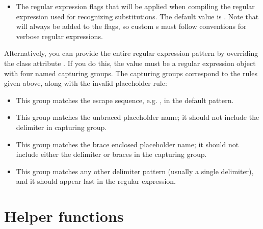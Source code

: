 \documentclass[letterpaper,10pt,english]{sphinxmanual}
\begin{document}
\begin{itemize}

\item {}
 \textendash{} The regular expression flags that will be applied when compiling
the regular expression used for recognizing substitutions.  The default value
is .  Note that  will always be added to the
flags, so custom s must follow conventions for verbose regular
expressions.


\end{itemize}

Alternatively, you can provide the entire regular expression pattern by
overriding the class attribute .  If you do this, the value must be a
regular expression object with four named capturing groups.  The capturing
groups correspond to the rules given above, along with the invalid placeholder
rule:
\begin{itemize}
\item {}
 \textendash{} This group matches the escape sequence, e.g. \sphinxcode{\sphinxupquote{\$\$}}, in the
default pattern.

\item {}
 \textendash{} This group matches the unbraced placeholder name; it should not
include the delimiter in capturing group.

\item {}
 \textendash{} This group matches the brace enclosed placeholder name; it should
not include either the delimiter or braces in the capturing group.

\item {}
 \textendash{} This group matches any other delimiter pattern (usually a single
delimiter), and it should appear last in the regular expression.

\end{itemize}


\section{Helper functions}
\label{\detokenize{string:helper-functions}}
\end{document}
